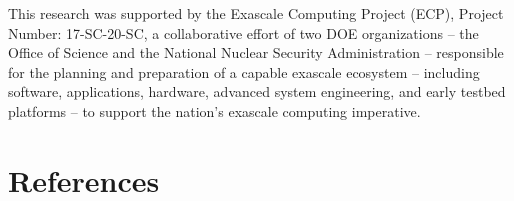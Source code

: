 \documentclass[review]{elsarticle}
\begin{document}
This research was supported by the Exascale Computing Project (ECP), Project Number: 17-SC-20-SC, a collaborative effort of two DOE organizations -- the Office of Science and the National Nuclear Security Administration -- responsible for the planning and preparation of a capable exascale ecosystem -- including software, applications, hardware, advanced system engineering, and early testbed platforms -- to support the nation's exascale computing imperative.

\section*{References}


\end{document}
